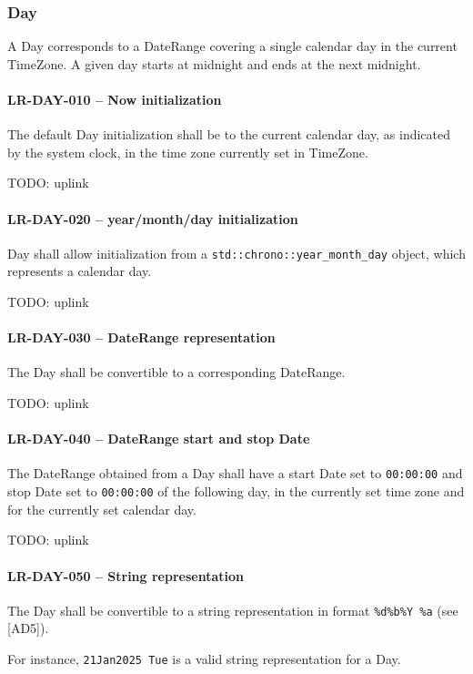 \subsubsection{Day}
A Day corresponds to a DateRange covering a single calendar day in
the current TimeZone. A given day starts at midnight and ends at the next
midnight.

\paragraph{LR-DAY-010 -- Now initialization}
The default Day initialization shall be to the current calendar day,
as indicated by the system clock, in the time zone currently set
in TimeZone.

TODO: uplink

\paragraph{LR-DAY-020 -- year/month/day initialization}
Day shall allow initialization from a \lstinline{std::chrono::year_month_day}
object, which represents a calendar day.

TODO: uplink

\paragraph{LR-DAY-030 -- DateRange representation}
The Day shall be convertible to a corresponding DateRange.

TODO: uplink

\paragraph{LR-DAY-040 -- DateRange start and stop Date}
The DateRange obtained from a Day shall have a start Date set
to \lstinline{00:00:00} and stop Date set to \lstinline{00:00:00} of the
following day, in the currently set time zone and for the currently set calendar
day.

TODO: uplink

\paragraph{LR-DAY-050 -- String representation}
The Day shall be convertible to a string representation in format
\lstinline{%d%b%Y %a} (see [AD5]).

For instance, \lstinline{21Jan2025 Tue} is a valid string representation
for a Day.

